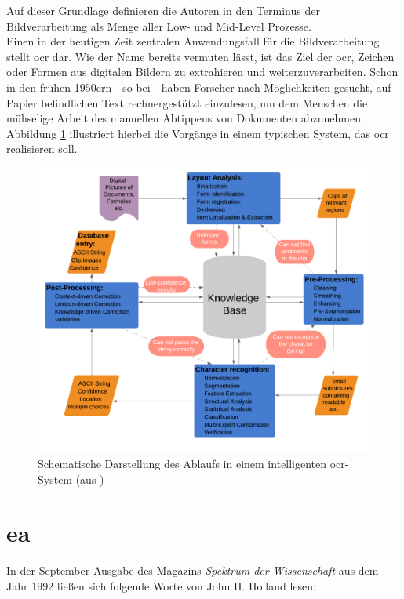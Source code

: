 		Auf dieser Grundlage definieren die Autoren in \cite{gonzalez-woods-imgproc} den Terminus der Bildverarbeitung als Menge aller Low- und Mid-Level Prozesse. \\
		
		Einen in der heutigen Zeit zentralen Anwendungsfall für die Bildverarbeitung stellt \gls{ocr} dar. Wie der Name bereits vermuten lässt, ist das Ziel der \gls{ocr}, Zeichen oder Formen aus digitalen Bildern zu extrahieren und weiterzuverarbeiten. Schon in den frühen 1950ern - so bei \cite{cher-et-al-ocr} - haben Forscher nach Möglichkeiten gesucht, auf Papier befindlichen Text rechnergestützt einzulesen, um dem Menschen die mühselige Arbeit des manuellen Abtippens von Dokumenten abzunehmen. Abbildung \ref{fig:ocr-system} illustriert hierbei die Vorgänge in einem typischen System, das \gls{ocr} realisieren soll. 
		
		\begin{figure}[H]
			\centering
			\includegraphics[width=0.7\linewidth]{Ablauf-OCR_Cheriet-et-al}
			\caption[typisches \gls{ocr}-Ablaufschema]{Schematische Darstellung des Ablaufs in einem intelligenten \gls{ocr}-System (aus \cite{cher-et-al-ocr})}
			\label{fig:ocr-system}
		\end{figure}
		
	
	\section{\gls{ea}}
	\label{sec:evol}
		
		In der September-Ausgabe des Magazins \textit{Spektrum der Wissenschaft} \cite{j-h-holland} aus dem Jahr 1992 ließen sich folgende Worte von John H. Holland lesen: \\
		

